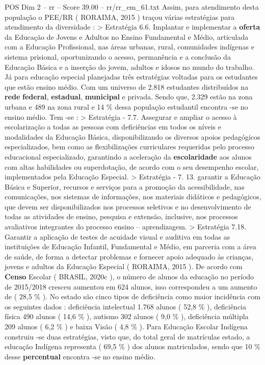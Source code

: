 \begin{textsample}{POS Dim 2 – rr – Score 39.00 – rr/rr\_em\_61.txt}
Assim, para atendimento desta população o PEE/RR ( RORAIMA, 2015 ) traçou várias estratégias para atendimento da diversidade : > Estratégia 6.6.
Implantar e implementar a \textbf{oferta} da Educação de Jovens e Adultos no Ensino Fundamental e Médio, articulada com a Educação Profissional, nas áreas urbanas, rural, comunidades indígenas e sistema prisional, oportunizando o acesso, permanência e a conclusão da Educação Básica e a inserção do jovem, adultos e idosos no mundo do trabalho.
Já para educação especial planejadas três estratégias voltadas para os estudantes que estão ensino médio.
Com um universo de 2.818 estudantes distribuídos na \textbf{rede} \textbf{federal}, \textbf{estadual}, \textbf{municipal} e privada.
Sendo que, 2.329 estão na zona urbana e 489 na zona rural e 14 \% dessa população estudantil encontra -se no ensino médio.
Tem -se : > Estratégia - 7.7.
Assegurar e ampliar o acesso à escolarização a todas as pessoas com deficiências em todos os níveis e modalidades da Educação Básica, disponibilizando os diversos apoios pedagógicos especializados, bem como as flexibilizações curriculares requeridas pelo processo educacional especializado, garantindo a aceleração da \textbf{escolaridade} aos alunos com altas habilidades ou superdotação, de acordo com o seu desempenho escolar, implementados pela Educação Especial. > Estratégia - 7. 13. garantir a Educação Básica e Superior, recursos e serviços para a promoção da acessibilidade, nas comunicações, nos sistemas de informações, nos materiais didáticos e pedagógicos, que devem ser disponibilizados nos processos seletivos e no desenvolvimento de todas as atividades de ensino, pesquisa e extensão, inclusive, nos processos avaliativos integrantes do processo ensino – aprendizagem. > Estratégia 7.18.
Garantir a aplicação de testes de acuidade visual e auditiva em todas as instituições de Educação Infantil, Fundamental e Médio, em parceria com a área de saúde, de forma a detectar problemas e fornecer apoio adequado às crianças, jovens e adultos da Educação Especial ( RORAIMA, 2015 ).
De acordo com \textbf{Censo} Escolar ( BRASIL, 2020c ), o número de alunos da educação no período de 2015/2018 cresceu aumentou em 624 alunos, isso correspondeu a um aumento de ( 28,5 \% ).
No estado são cinco tipos de deficiência como maior incidência com os seguintes dados : deficiência intelectual 1.768 alunos ( 52,8 \% ), deficiência física 490 alunos ( 14,6 \% ), autismo 302 alunos ( 9,0 \% ), deficiência múltipla 209 alunos ( 6,2 \% ) e baixa Visão ( 4,8 \% ).
Para Educação Escolar Indígena construiu -se duas estratégias, visto que, do total geral de matrículas estado, a educação Indígena representa ( 69,5 \% ) dos alunos matriculados, sendo que 10 \% desse \textbf{percentual} encontra -se no ensino médio.

\end{textsample}
